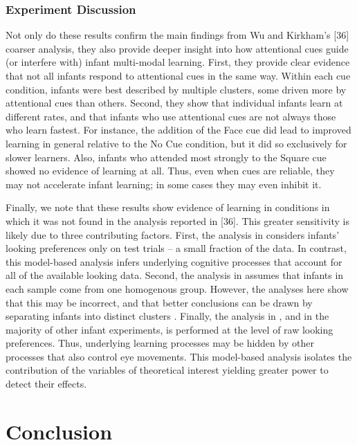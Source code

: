 \documentclass[12pt]{article}
\begin{document}
\subsubsection*{Experiment Discussion}
	Not only do these results confirm the main findings from Wu and Kirkham’s [36] coarser analysis, they also provide deeper insight into how attentional cues guide (or interfere with) infant multi-modal learning. First, they provide clear evidence that not all infants respond to attentional cues in the same way. Within each cue condition, infants were best described by multiple clusters, some driven more by attentional cues than others. Second, they show that individual infants learn at different rates, and that infants who use attentional cues are not always those who learn fastest. For instance, the addition of the Face cue did lead to improved learning in general relative to the No Cue condition, but it did so exclusively for slower learners. Also, infants who attended most strongly to the Square cue showed no evidence of learning at all. Thus, even when cues are reliable, they may not accelerate infant learning; in some cases they may even inhibit it. 

	Finally, we note that these results show evidence of learning in conditions in which it was not found in the analysis reported in [36]. This greater sensitivity is likely due to three contributing factors. First, the analysis in \cite{Wu2010a} considers infants' looking preferences only on test trials -- a small fraction of the data. In contrast, this model-based analysis infers underlying cognitive processes that account for all of the available looking data. Second, the analysis in \cite{Wu2010a} assumes that infants in each sample come from one homogenous group. However, the analyses here show that this may be incorrect, and that better conclusions can be drawn by separating infants into distinct clusters \cite{Estes1956, Gallistel2004, Siegler1987}. Finally, the analysis in \cite{Wu2010a}, and in the majority of other infant experiments, is performed at the level of raw looking preferences. Thus, underlying learning processes may be hidden by other processes that also control eye movements. This model-based analysis isolates the contribution of the variables of theoretical interest yielding greater power to detect their effects.

\section*{Conclusion}
	
\end{document}
